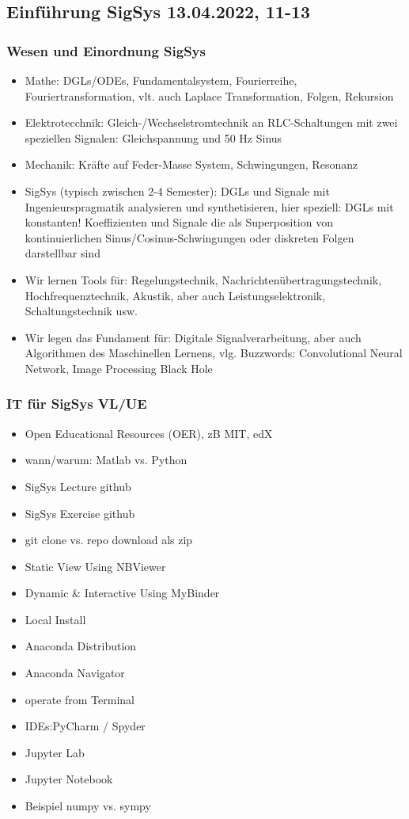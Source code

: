 \newpage
\subsection*{Einführung SigSys 13.04.2022, 11-13}

\subsubsection*{Wesen und Einordnung SigSys}
\begin{itemize}
\item Mathe: DGLs/ODEs, Fundamentalsystem, Fourierreihe, Fouriertransformation,
vlt. auch Laplace Transformation, Folgen, Rekursion
\item Elektrotecchnik: Gleich-/Wechselstromtechnik an RLC-Schaltungen mit
zwei speziellen Signalen: Gleichspannung und 50 Hz Sinus
\item Mechanik: Kräfte auf Feder-Masse System, Schwingungen, Resonanz
\item SigSys (typisch zwischen 2-4 Semester): DGLs und Signale mit
Ingenieurspragmatik analysieren und synthetisieren, hier speziell: DGLs mit
konstanten! Koeffizienten und Signale die als Superposition von kontinuierlichen
Sinus/Cosinus-Schwingungen oder diskreten Folgen darstellbar sind
\item Wir lernen Tools für: Regelungstechnik, Nachrichtenübertragungstechnik,
Hochfrequenztechnik, Akustik, aber auch Leistungselektronik, Schaltungstechnik
usw.
\item Wir legen das Fundament für: Digitale Signalverarbeitung, aber auch
Algorithmen des Maschinellen Lernens, vlg. Buzzwords: Convolutional Neural Network,
Image Processing Black Hole
\end{itemize}

\subsubsection*{IT für SigSys VL/UE}
\begin{itemize}
\item Open Educational Resources (OER), zB MIT, edX
\item wann/warum: Matlab vs. Python
\item SigSys Lecture github
\item SigSys Exercise github
\item git clone vs. repo download als zip
\item Static View Using NBViewer
\item Dynamic \& Interactive Using MyBinder
\item Local Install
\item Anaconda Distribution
\item Anaconda Navigator
\item operate from Terminal
\item IDEs:PyCharm / Spyder
\item Jupyter Lab
\item Jupyter Notebook
\item Beispiel numpy vs. sympy
\end{itemize}
